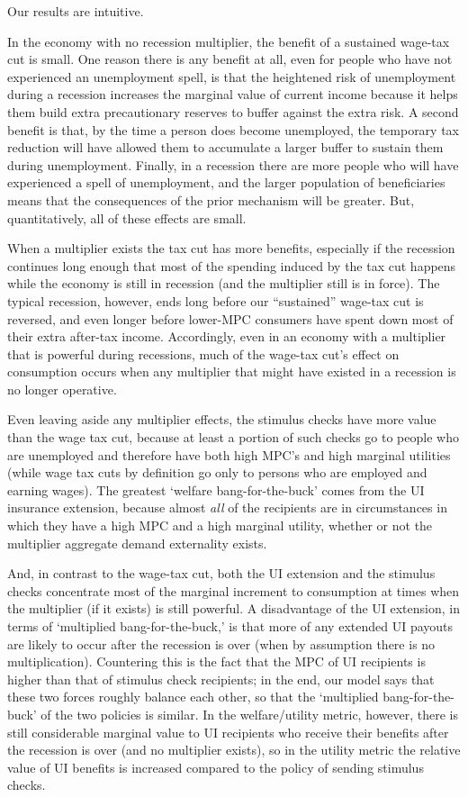 \documentclass[../HAFiscal]{subfiles}
\begin{document}
Our results are intuitive. 

In the economy with no recession multiplier, the benefit of a sustained wage-tax cut is small.  One reason there is any benefit at all, even for people who have not experienced an unemployment spell, is that the heightened risk of unemployment during a recession increases the marginal value of current income because it helps them build extra precautionary reserves to buffer against the extra risk.  A second benefit is that, by the time a person does become unemployed, the temporary tax reduction will have allowed them to accumulate a larger buffer to sustain them during unemployment.  Finally, in a recession there are more people who will have experienced a spell of unemployment, and the larger population of beneficiaries means that the consequences of the prior mechanism will be greater.  But, quantitatively, all of these effects are small.

When a multiplier exists the tax cut has more benefits, especially if the recession continues long enough that most of the spending induced by the tax cut happens while the economy is still in recession (and the multiplier still is in force).  The typical recession, however, ends long before our ``sustained'' wage-tax cut is reversed, and even longer before lower-MPC consumers have spent down most of their extra after-tax income. Accordingly, even in an economy with a multiplier that is powerful during recessions, much of the wage-tax cut's effect on consumption occurs when any multiplier that might have existed in a recession is no longer operative.

Even leaving aside any multiplier effects, the stimulus checks have more value than the wage tax cut, because at least a portion of such checks go to people who are unemployed and therefore have both high MPC's and high marginal utilities (while wage tax cuts by definition go only to persons who are employed and earning wages). The greatest `welfare bang-for-the-buck' comes from the UI insurance extension, because almost \textit{all} of the recipients are in circumstances in which they have a high MPC and a high marginal utility, whether or not the multiplier aggregate demand externality exists.

And, in contrast to the wage-tax cut, both the UI extension and the stimulus checks concentrate most of the marginal increment to consumption at times when the multiplier (if it exists) is still powerful.  A disadvantage of the UI extension, in terms of `multiplied bang-for-the-buck,' is that more of any extended UI payouts are likely to occur after the recession is over (when by assumption there is no multiplication).  Countering this is the fact that the MPC of UI recipients is higher than that of stimulus check recipients; in the end, our model says that these two forces roughly balance each other, so that the `multiplied bang-for-the-buck' of the two policies is similar.  In the welfare/utility metric, however, there is still considerable marginal value to UI recipients who receive their benefits after the recession is over (and no multiplier exists), so in the utility metric the relative value of UI benefits is increased compared to the policy of sending stimulus checks.
\end{document}
